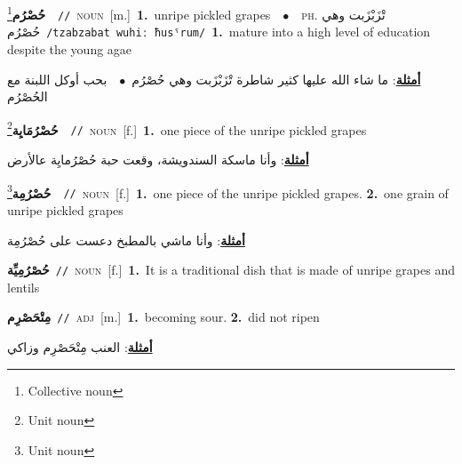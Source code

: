 \documentclass[10pt,a4paper,twoside]{article} %
\begin{document}
\begin{multicols}{2}
{\setlength\topsep{0pt}\textbf{\foreignlanguage{arabic}{حُصْرُم}}\footnote{Collective noun}\ \ {\color{gray}\texttt{//}\color{black}}\ \textsc{noun}\ [m.]\ \textbf{1.}~unripe pickled grapes\ \ $\bullet$\ \ \textsc{ph.} \color{gray} \foreignlanguage{arabic}{تْزَبْزَبت وهي حُصْرُم}\color{black}\ {\color{gray}\texttt{/{\sffamily tzabzabat wuhiː ħusˤrum}/}\color{black}}\ \textbf{1.}~mature into a high level of education despite the young agae\  \begin{flushright}\color{gray}\foreignlanguage{arabic}{\textbf{\underline{\foreignlanguage{arabic}{أمثلة}}}: ما شاء الله عليها كثير شاطرة تْزَبْزَبت وهي حُصْرُم\ $\bullet$\ \  بحب أوكل اللبنة مع الحُصْرُم}\end{flushright}\color{black}} \vspace{2mm}

{\setlength\topsep{0pt}\textbf{\foreignlanguage{arabic}{حُصْرُمَايِة}}\footnote{Unit noun}\ \ {\color{gray}\texttt{//}\color{black}}\ \textsc{noun}\ [f.]\ \textbf{1.}~one piece of the unripe pickled grapes\  \begin{flushright}\color{gray}\foreignlanguage{arabic}{\textbf{\underline{\foreignlanguage{arabic}{أمثلة}}}: وأنا ماسكة السندويشة، وقعت حبة حُصْرُمايِة عالأرض}\end{flushright}\color{black}} \vspace{2mm}

{\setlength\topsep{0pt}\textbf{\foreignlanguage{arabic}{حُصْرُمِة}}\footnote{Unit noun}\ \ {\color{gray}\texttt{//}\color{black}}\ \textsc{noun}\ [f.]\ \textbf{1.}~one piece of the unripe pickled grapes.  \textbf{2.}~one grain of unripe pickled grapes\  \begin{flushright}\color{gray}\foreignlanguage{arabic}{\textbf{\underline{\foreignlanguage{arabic}{أمثلة}}}: وأنا ماشي بالمطبخ دعست على حُصْرُمِة}\end{flushright}\color{black}} \vspace{2mm}

{\setlength\topsep{0pt}\textbf{\foreignlanguage{arabic}{حُصْرُمِيِّة}}\ {\color{gray}\texttt{//}\color{black}}\ \textsc{noun}\ [f.]\ \textbf{1.}~It is a traditional dish that is made of unripe grapes and lentils\ } \vspace{2mm}

{\setlength\topsep{0pt}\textbf{\foreignlanguage{arabic}{مِتْحَصْرِم}}\ {\color{gray}\texttt{//}\color{black}}\ \textsc{adj}\ [m.]\ \textbf{1.}~becoming sour.  \textbf{2.}~did not ripen\  \begin{flushright}\color{gray}\foreignlanguage{arabic}{\textbf{\underline{\foreignlanguage{arabic}{أمثلة}}}: العنب مِتْحَصْرِم وزاكي}\end{flushright}\color{black}} \vspace{2mm}


\end{multicols}
\end{document}
